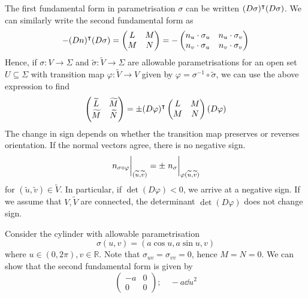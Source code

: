\begin{remark}
	The first fundamental form in parametrisation \( \sigma \) can be written \( (D \sigma)^\intercal (D \sigma) \).
	We can similarly write the second fundamental form as
	\[
		-(Dn)^\intercal (D\sigma) = \begin{pmatrix}
			L & M \\
			M & N
		\end{pmatrix} = -\begin{pmatrix}
			n_u \cdot \sigma_u & n_u \cdot \sigma_v \\
			n_v \cdot \sigma_u & n_v \cdot \sigma_v
		\end{pmatrix}
	\]
	Hence, if \( \sigma \colon V \to \Sigma \) and \( \widetilde \sigma \colon \widetilde V \to \Sigma \) are allowable parametrisations for an open set \( U \subseteq \Sigma \) with transition map \( \varphi \colon \widetilde V \to V \) given by \( \varphi = \sigma^{-1} \circ \widetilde \sigma \), we can use the above expression to find
	\[
		\begin{pmatrix}
			\widetilde L & \widetilde M \\
			\widetilde M & \widetilde N
		\end{pmatrix} = \pm (D\varphi)^\intercal \begin{pmatrix}
			L & M \\
			M & N
		\end{pmatrix} (D\varphi)
	\]
	The change in sign depends on whether the transition map preserves or reverses orientation.
	If the normal vectors agree, there is no negative sign.
	\[
		\eval{n_{\sigma \circ \varphi}}_{(\widetilde u, \widetilde v)} = \pm \eval{n_\sigma}_{\varphi(\widetilde u, \widetilde v)}
	\]
	for \( (\widetilde u, \widetilde v) \in \widetilde V \).
	In particular, if \( \det (D \varphi) < 0 \), we arrive at a negative sign.
	If we assume that \( V, \widetilde V \) are connected, the determinant \( \det (D \varphi) \) does not change sign.
\end{remark}
\begin{example}
	Consider the cylinder with allowable parametrisation
	\[
		\sigma(u,v) = (a \cos u, a \sin u, v)
	\]
	where \( u \in (0,2\pi), v \in \mathbb R \).
	Note that \( \sigma_{uv} = \sigma_{vv} = 0 \), hence \( M = N = 0 \).
	We can show that the second fundamental form is given by
	\[
		\begin{pmatrix}
			-a & 0 \\
			0  & 0
		\end{pmatrix};\quad -a \dd{u}^2
	\]
\end{example}

